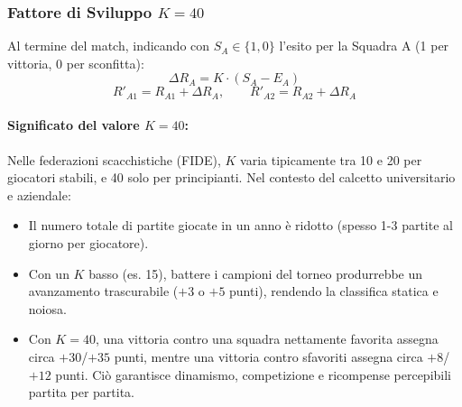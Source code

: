 \documentclass[11pt,a4paper]{article}
\begin{document}
\subsubsection{Fattore di Sviluppo \texorpdfstring{$K=40$}{K=40}}
Al termine del match, indicando con $S_A \in \{1, 0\}$ l'esito per la Squadra A (1 per vittoria, 0 per sconfitta):
\begin{equation}
\Delta R_A = K \cdot (S_A - E_A)
\end{equation}
\begin{equation}
R'_{A1} = R_{A1} + \Delta R_A, \qquad R'_{A2} = R_{A2} + \Delta R_A
\end{equation}

\paragraph{Significato del valore $K=40$:}
Nelle federazioni scacchistiche (FIDE), $K$ varia tipicamente tra 10 e 20 per giocatori stabili, e 40 solo per principianti. Nel contesto del calcetto universitario e aziendale:
\begin{itemize}
    \item Il numero totale di partite giocate in un anno \`e ridotto (spesso 1-3 partite al giorno per giocatore).
    \item Con un $K$ basso (es. 15), battere i campioni del torneo produrrebbe un avanzamento trascurabile ($+3$ o $+5$ punti), rendendo la classifica statica e noiosa.
    \item Con $K=40$, una vittoria contro una squadra nettamente favorita assegna circa $+30$/$+35$ punti, mentre una vittoria contro sfavoriti assegna circa $+8$/$+12$ punti. Ci\`o garantisce dinamismo, competizione e ricompense percepibili partita per partita.
\end{itemize}
\end{document}
